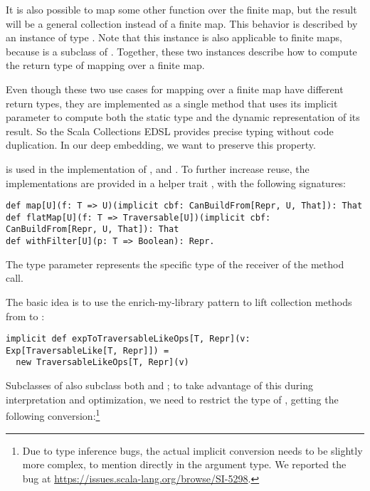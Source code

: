 It is also possible to map some other function over the finite map, but the result will be a general collection instead of a finite map. This behavior is described by an instance of type \code{CanBuildFrom[Traversable[T], U, Traversable[U]}. Note that this instance is also applicable to finite maps, because  is a subclass of . Together, these two instances describe how to compute the return type of mapping over a finite map.

Even though these two use cases for mapping over a finite map have different return types, they are implemented as a single method that uses its implicit  parameter to compute both the static type and the dynamic representation of its result. So the Scala Collections EDSL provides precise typing without code duplication. In our deep embedding, we want to preserve this property.

 is used in the implementation of ,  and . To further increase reuse, the implementations are provided in a helper trait , with the following signatures:

\begin{lstlisting}
def map[U](f: T => U)(implicit cbf: CanBuildFrom[Repr, U, That]): That
def flatMap[U](f: T => Traversable[U])(implicit cbf: CanBuildFrom[Repr, U, That]): That
def withFilter[U](p: T => Boolean): Repr.
\end{lstlisting}

The  type parameter represents the specific type of the receiver of the method call.

The basic idea is to use the enrich-my-library pattern to lift collection methods from  to :
\begin{lstlisting}
implicit def expToTraversableLikeOps[T, Repr](v: Exp[TraversableLike[T, Repr]]) =
  new TraversableLikeOps[T, Repr](v)
\end{lstlisting}

Subclasses of  also subclass both  and ; to take advantage of this during interpretation and optimization, we need to restrict the type of , getting the following conversion:\footnote{Due to type inference bugs, the actual implicit conversion needs to be slightly more complex, to mention  directly in the argument type. We reported the bug at \url{https://issues.scala-lang.org/browse/SI-5298}.}

